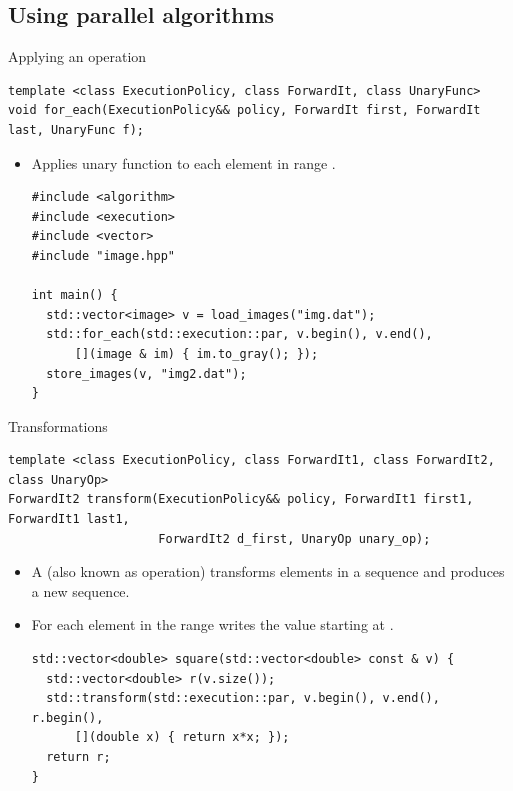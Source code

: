 \subsection{Using parallel algorithms}

\begin{frame}[t,fragile]{Applying an operation}
\begin{lstlisting}
template <class ExecutionPolicy, class ForwardIt, class UnaryFunc>
void for_each(ExecutionPolicy&& policy, ForwardIt first, ForwardIt last, UnaryFunc f);
\end{lstlisting}

\begin{itemize}
  \item Applies unary function  to each element in range
        \textgood{[first,last)}.

\begin{lstlisting}
#include <algorithm>
#include <execution>
#include <vector>
#include "image.hpp"

int main() {
  std::vector<image> v = load_images("img.dat");
  std::for_each(std::execution::par, v.begin(), v.end(), 
      [](image & im) { im.to_gray(); });
  store_images(v, "img2.dat");
}
\end{lstlisting}

\end{itemize}
\end{frame}

\begin{frame}[t,fragile]{Transformations}
\begin{lstlisting}
template <class ExecutionPolicy, class ForwardIt1, class ForwardIt2, class UnaryOp>
ForwardIt2 transform(ExecutionPolicy&& policy, ForwardIt1 first1, ForwardIt1 last1,
                     ForwardIt2 d_first, UnaryOp unary_op);
\end{lstlisting}
\begin{itemize}
  \item A  (also known as  operation) 
        transforms elements in a sequence and produces a new sequence.

  \item For each element  in the range \textgood{[first1, last1)}
        writes the value  starting at \textgood{[d\_first,\ldots)}.
\begin{lstlisting}
std::vector<double> square(std::vector<double> const & v) {
  std::vector<double> r(v.size());
  std::transform(std::execution::par, v.begin(), v.end(), r.begin(), 
      [](double x) { return x*x; });
  return r;
}
\end{lstlisting}

\end{itemize}
\end{frame}

